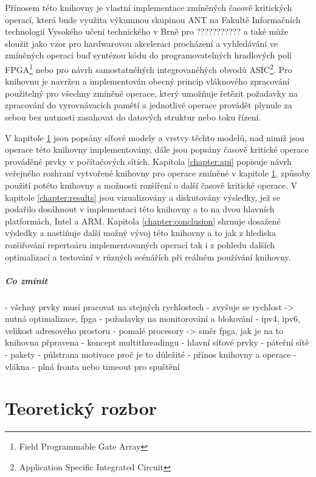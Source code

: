 Přínosem této knihovny je vlastní implementace zmíněných časově kritických operací, která bude
využita výkumnou skupinou ANT na Fakultě Informačních technologií Vysokého učení technického v Brně
pro ??????????? a také může sloužit jako vzor pro hardwarovou akceleraci procházení a vyhledávání ve
zmíněných operací buď syntézou kódu do programovatelných hradlových polí FPGA\footnote{Field Programmable Gate Array}
nebo pro návrh samostatnéhých integrovanéhých obvodů ASIC\footnote{Application Specific Integrated Circuit}.
Pro knihovnu je navržen a implementován obecný princip vláknového zpracování použitelný pro všechny
zmíněné operace, který umožňuje řetězit požadavky na zpracování do vyrovnávacích pamětí a jednotlivé operace
provádět plynule za sebou bez nutnosti zasahovat do datových struktur nebo toku řízení.

V kapitole \ref{chapter:theoretical} jsou popsány síťové modely a vrstvy těchto modelů,
nad nimiž jsou operace této knihovny implementovány, dále jsou popsány časově kritické operace prováděné
prvky v počítačových sítích. Kapitola \ref{chapter:api} popisuje návrh veřejného rozhraní vytvořené knihovny
pro operace zmíněné v kapitole \ref{chapter:theoretical}, způsoby použití potéto knihovny a možnosti rozšíření
o další časově kritické operace. V kapitole \ref{chapter:results} jsou vizualizovány a diskutovány
výsledky, jež se podařilo dosáhnout v implementaci této knihovny a to na dvou hlavních platformách, Intel a ARM.
Kapitola \ref{chapter:conclusion} shrnuje dosažené výsledky a nastiňuje další možný vývoj této knihovny
a to jak z hlediska rozšiřování repertoáru implementovaných operací tak i z pohledu dalších optimalizací
a testování v různých scénářích při reálném používání knihovny.

\paragraph{Co zmínit}
- všchny prvky musí pracovat na stejných rychlostech
- zvyšuje se rychlost -> nutná optimalizace, fpga
- požadavky na monitorování a blokování
- ipv4, ipv6, velikost adresového prostoru
- pomalé procesory -> směr fpga, jak je na to knihovna přpravena
- koncept multithreadingu
- hlavní síťové prvky
- páteřní sítě
- pakety
- půlstrana motivace proč je to důležité
- přínos knihovny a operace
- vlákna - plná fronta nebo timeout pro spuštění

\chapter{Teoretický rozbor}\label{chapter:theoretical}

